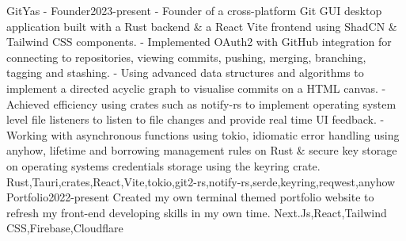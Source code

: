 
\begin{projects}
    \project
        {GitYas - Founder}{2023-present}
        {}
        {- Founder of a cross-platform Git GUI desktop application built with a Rust backend \& a React Vite frontend using ShadCN \& Tailwind CSS components.
        \newline
        - Implemented OAuth2 with GitHub integration for connecting to repositories, viewing commits, pushing, merging, branching, tagging and stashing.
        \newline
        - Using advanced data structures and algorithms to implement a directed acyclic graph to visualise commits on a HTML canvas.
        \newline
        - Achieved efficiency using crates such as notify-rs to implement operating system level file listeners to listen to file changes and provide real time UI feedback.
        \newline
        - Working with asynchronous functions using tokio, idiomatic error handling using anyhow, lifetime and borrowing management rules on Rust \& secure key storage on operating systems credentials storage using the keyring crate.}
        {Rust,Tauri,crates,React,Vite,tokio,git2-rs,notify-rs,serde,keyring,reqwest,anyhow}
    \project
	{Portfolio}{2022-present}
	{}
	{Created my own terminal themed portfolio website to refresh my front-end developing skills in my own time.}
	{Next.Js,React,Tailwind CSS,Firebase,Cloudflare}
\end{projects}